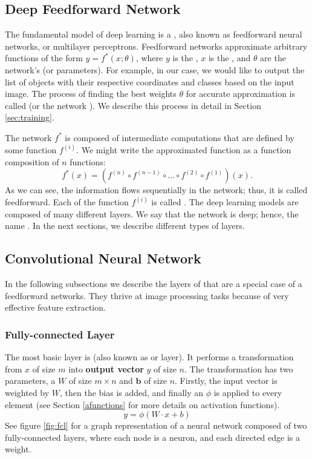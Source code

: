 \subsection{Deep Feedforward Network}
The fundamental model of deep learning is a , also
known as feedforward neural networks, or multilayer perceptrons. Feedforward
networks approximate arbitrary functions of the form $y = f^*(x;\theta)$, where
$y$ is the , $x$ is the , and $\theta$ are the network's
 (or parameters). For example, in our case, we would like to
output the list of objects with their respective coordinates and classes based
on the input image. The process of finding the best weights $\theta$ for
accurate approximation is called  (or the network ).
We describe this process in detail in Section \ref{sec:training}.

The network $f^*$ is composed of intermediate computations that are defined by
some function $f^{(i)}$. We might write the approximated function as a function
composition of $n$ functions:
$$
    f^*(x) = (f^{(n)} \circ f^{(n-1)} \circ ... \circ f^{(2)} \circ f^{(1)})(x).
$$
As we can see, the information flows sequentially in the network; thus, it is
called feedforward. Each of the function $f^{(i)}$ is called . The
deep learning models are composed of many different layers. We say that the
network is deep; hence, the name . In the next sections, we
describe different types of layers.

\subsection{Convolutional Neural Network}
In the following subsections we describe the layers of  that are a special case of a feedforward networks. They thrive at
image processing tasks because of very effective feature extraction.

\subsubsection{Fully-connected Layer}
The most basic layer is  (also known as
 or  layer). It performs a transformation from
 $x$ of size $m$ into \textbf{output vector}
$y$ of size $n$. The transformation has two parameters, a
 $W$ of size $m \times n$ and 
$\boldsymbol{b}$ of size $n$. Firstly, the input vector is weighted by $W$, then
the bias is added, and finally an  $\phi$
is applied to every element (see Section \ref{afunctions} for more details on
activation functions).
$$
    y = \phi(W\cdot x + b)
$$
See figure \ref{fig:fcl} for a graph representation of a neural network composed
of two fully-connected layers, where each node is a neuron, and each directed
edge is a weight.

